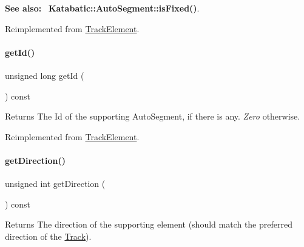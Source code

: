 {\bfseries See also\+:}~ \textbf{ Katabatic\+::\+Auto\+Segment\+::is\+Fixed()}. 

Reimplemented from \hyperlink{classKite_1_1TrackElement_afd7362b850709bed8b61c1aa22399f97}{Track\+Element}.

\mbox{\label{classKite_1_1TrackFixedSegment_afdedcef127ad2a3677a5b48d7d3453f3}} 
\paragraph{\texorpdfstring{get\+Id()}{getId()}}
{\footnotesize\ttfamily unsigned long get\+Id (\begin{DoxyParamCaption}{ }\end{DoxyParamCaption}) const\hspace{0.3cm}{\ttfamily [virtual]}}

\begin{DoxyReturn}{Returns}
The {\ttfamily Id} of the supporting Auto\+Segment, if there is any. {\itshape Zero} otherwise. 
\end{DoxyReturn}


Reimplemented from \hyperlink{classKite_1_1TrackElement_afdedcef127ad2a3677a5b48d7d3453f3}{Track\+Element}.

\mbox{\label{classKite_1_1TrackFixedSegment_a0dd7cf705ace42c662c289955313b2e9}} 
\paragraph{\texorpdfstring{get\+Direction()}{getDirection()}}
{\footnotesize\ttfamily unsigned int get\+Direction (\begin{DoxyParamCaption}{ }\end{DoxyParamCaption}) const\hspace{0.3cm}{\ttfamily [virtual]}}

\begin{DoxyReturn}{Returns}
The direction of the supporting element (should match the preferred direction of the \hyperlink{classKite_1_1Track}{Track}). 
\end{DoxyReturn}


